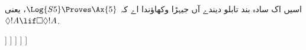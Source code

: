 \documentclass[../../../include/open-logic-section]{subfiles}
\begin{document}
\begin{ex}
  اسیں اک سادہ بند تابلو دیندے آں جیہڑا وکھاؤندا اے کہ $\Log{S5} \Proves
  \Ax{5}$، یعنی $\Diamond!A \lif \Box\Diamond!A$.
  \begin{oltableau}
    [\pFmla{\False}{\Diamond\formula{A} \lif \Box\Diamond \formula{A}}{1},
      just = \TAss
      [\pFmla{\True}{\Diamond \formula{A}}{1}, just = {\TRule{\False}{\lif}[1]}
        [\pFmla{\False}{\Box\Diamond \formula{A}}{1},
          just = {\TRule{\False}{\lif}[1]}
          [\pFmla{\False}{\Diamond \formula{A}}{2},
            just = {\TRule{\False}{\Box}[3]}
            [\pFmla{\True}{\formula{A}}{3},
              just = {\TRule{\True}{\Diamond}[2]}
                [\pFmla{\False}{\formula{A}}{3},
                  just = {\TRule{\False}{\Diamond}[4]}, close]
            ]
          ]
        ]
      ]
    ]
  \end{oltableau}
\end{ex}
\end{document}
